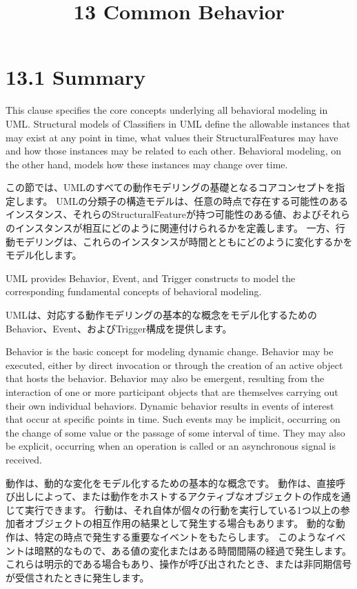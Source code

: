 \documentclass[a4paper,11pt]{ltjsarticle}
\title{13 Common Behavior}
\begin{document}
\maketitle


\section*{13.1 Summary}

This clause specifies the core concepts underlying all behavioral modeling in UML. 
Structural models of Classifiers in UML define the allowable instances that may exist at any point in time, what values their StructuralFeatures may have and how those instances may be related to each other. 
Behavioral modeling, on the other hand, models how these instances may change over time.

この節では、UMLのすべての動作モデリングの基礎となるコアコンセプトを指定します。
UMLの分類子の構造モデルは、任意の時点で存在する可能性のあるインスタンス、それらのStructuralFeatureが持つ可能性のある値、およびそれらのインスタンスが相互にどのように関連付けられるかを定義します。
一方、行動モデリングは、これらのインスタンスが時間とともにどのように変化するかをモデル化します。

UML provides Behavior, Event, and Trigger constructs to model the corresponding fundamental concepts of behavioral modeling.

UMLは、対応する動作モデリングの基本的な概念をモデル化するためのBehavior、Event、およびTrigger構成を提供します。

Behavior is the basic concept for modeling dynamic change. 
Behavior may be executed, either by direct invocation or through the creation of an active object that hosts the behavior. 
Behavior may also be emergent, resulting from the interaction of one or more participant objects that are themselves carrying out their own individual behaviors.
Dynamic behavior results in events of interest that occur at specific points in time. 
Such events may be implicit, occurring on the change of some value or the passage of some interval of time. 
They may also be explicit, occurring when an operation is called or an asynchronous signal is received.


動作は、動的な変化をモデル化するための基本的な概念です。
動作は、直接呼び出しによって、または動作をホストするアクティブなオブジェクトの作成を通じて実行できます。
行動は、それ自体が個々の行動を実行している1つ以上の参加者オブジェクトの相互作用の結果として発生する場合もあります。
動的な動作は、特定の時点で発生する重要なイベントをもたらします。
このようなイベントは暗黙的なもので、ある値の変化またはある時間間隔の経過で発生します。
これらは明示的である場合もあり、操作が呼び出されたとき、または非同期信号が受信されたときに発生します。
\end{document}
